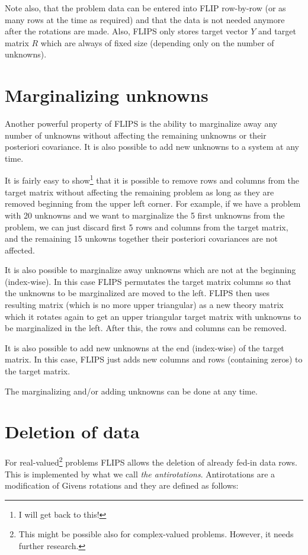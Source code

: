 \documentclass[a4paper,twoside]{refrep}
\begin{document}
\attention Note also, that the problem data can be entered into FLIP row-by-row (or as many rows at the time as required) and that the data is not needed anymore after the rotations are made. Also, FLIPS only stores target vector $Y$ and target matrix $R$ which are always of fixed size (depending only on the number of unknowns). 

\section{Marginalizing unknowns}\label{margi}

Another powerful property of FLIPS is the ability to marginalize away any number of unknowns without affecting the remaining unknowns or their posteriori covariance. It is also possible to add new unknowns to a system at any time.

It is fairly easy to show\footnote{I will get back to this!} that it is possible to remove rows and columns from the target matrix without affecting the remaining problem as long as they are removed beginning from the upper left corner. For example, if we have a problem with 20 unknowns and we want to marginalize the 5 first unknowns from the problem, we can just discard first 5 rows and columns from the target matrix, and the remaining 15 unkowns together their posteriori covariances are not affected.

It is also possible to marginalize away unknowns which are not at the beginning (index-wise). In this case FLIPS permutates the target matrix columns so that the unknowns to be marginalized are moved to the left. FLIPS then uses resulting matrix (which is no more upper triangular) as a new theory matrix which it rotates again to get an upper triangular target matrix with unknowns to be marginalized in the left. After this, the rows and columns can be removed.

It is also possible to add new unknowns at the end (index-wise) of the target matrix. In this case, FLIPS just adds new columns and rows (containing zeros) to the target matrix.

\attention The marginalizing and/or adding unknowns can be done at any time.

\section{Deletion of data}\label{deletion}

For real-valued\footnote{This might be possible also for complex-valued problems. However, it needs further research.} problems FLIPS allows the deletion of already fed-in data rows. This is implemented by what we call \emph{the antirotations}. Antirotations are a modification of Givens rotations and they are defined as follows:
\end{document}
